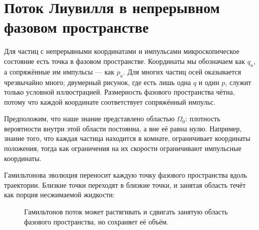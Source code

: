 \begin{classroomqa}
\end{classroomqa}

\section{Поток Лиувилля в непрерывном фазовом пространстве}

Для частиц с непрерывными координатами и импульсами микроскопическое состояние есть точка в фазовом пространстве. Координаты мы обозначаем как \(q_a\), а сопряжённые им импульсы — как \(p_a\). Для многих частиц осей оказывается чрезвычайно много; двумерный рисунок, где есть лишь одна \(q\) и один \(p\), служит только условной иллюстрацией. Размерность фазового пространства чётна, потому что каждой координате соответствует сопряжённый импульс.

Предположим, что наше знание представлено областью \(\Omega_0\): плотность вероятности внутри этой области постоянна, а вне её равна нулю. Например, знание того, что каждая частица находится в комнате, ограничивает координаты положения, тогда как ограничения на их скорости ограничивают импульсные координаты.

Гамильтонова эволюция переносит каждую точку фазового пространства вдоль траектории. Близкие точки переходят в близкие точки, и занятая область течёт как порция несжимаемой жидкости:
\begin{figure}[htbp]
\centering
{}
\caption{Гамильтонов поток может растягивать и сдвигать занятую область фазового пространства, но сохраняет её объём.}
\label{fig:sm1-liouville-flow}
\end{figure}

